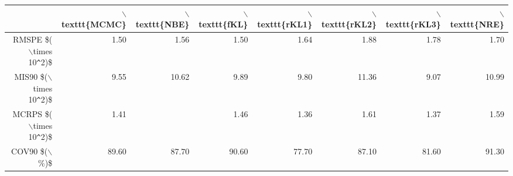 \documentclass[12pt]{article}
\begin{document}
\thispagestyle{empty}
\begin{table}[ht]
\centering
\begin{tabular}{rrrrrrrr}
  \hline
 & $\backslash$texttt\{MCMC\} & $\backslash$texttt\{NBE\} & $\backslash$texttt\{fKL\} & $\backslash$texttt\{rKL1\} & $\backslash$texttt\{rKL2\} & $\backslash$texttt\{rKL3\} & $\backslash$texttt\{NRE\} \\ 
  \hline
RMSPE \$($\backslash$times 10\verb|^|2)\$ & 1.50 & 1.56 & 1.50 & 1.64 & 1.88 & 1.78 & 1.70 \\ 
  MIS90 \$($\backslash$times 10\verb|^|2)\$ & 9.55 & 10.62 & 9.89 & 9.80 & 11.36 & 9.07 & 10.99 \\ 
  MCRPS \$($\backslash$times 10\verb|^|2)\$ & 1.41 &  & 1.46 & 1.36 & 1.61 & 1.37 & 1.59 \\ 
  COV90 \$($\backslash$\%)\$ & 89.60 & 87.70 & 90.60 & 77.70 & 87.10 & 81.60 & 91.30 \\ 
   \hline
\end{tabular}
\end{table}
\end{document}

